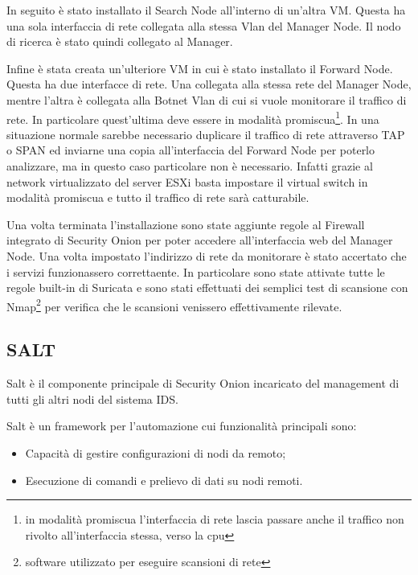 In seguito è stato installato il Search Node all'interno di un'altra VM. Questa ha una sola interfaccia di rete collegata alla stessa Vlan del Manager Node. Il nodo di ricerca è stato quindi collegato al Manager.

Infine è stata creata un'ulteriore VM in cui è stato installato il Forward Node. Questa ha due interfacce di rete. Una collegata alla stessa rete del Manager Node, mentre l'altra è collegata alla Botnet Vlan di cui si vuole monitorare il traffico di rete. In particolare quest'ultima deve essere in modalità promiscua\footnote{in modalità promiscua l'interfaccia di rete lascia passare anche il traffico non rivolto all'interfaccia stessa, verso la cpu}.
In una situazione normale sarebbe necessario duplicare il traffico di rete attraverso TAP o SPAN ed inviarne una copia all'interfaccia del Forward Node per poterlo analizzare, ma in questo caso particolare non è necessario. Infatti grazie al network virtualizzato del server ESXi basta impostare il virtual switch in modalità promiscua e tutto il traffico di rete sarà catturabile.

Una volta terminata l'installazione sono state aggiunte regole al Firewall integrato di Security Onion per poter accedere all'interfaccia web del Manager Node. 
Una volta impostato l'indirizzo di rete da monitorare è stato accertato che i servizi funzionassero correttaente.
In particolare sono state attivate tutte le regole built-in di Suricata e sono stati effettuati dei semplici test di scansione con Nmap\footnote{software utilizzato per eseguire scansioni di rete} \cite{nmap}  per verifica che le scansioni venissero effettivamente  rilevate.



\subsection{SALT}


Salt \cite{salt} è il componente principale di Security Onion incaricato del management di tutti gli altri nodi del sistema  IDS.

Salt è un framework per l'automazione cui funzionalità principali sono:
\begin{itemize}
    \item Capacità di gestire configurazioni di nodi da remoto;
    \item Esecuzione di comandi  e prelievo di dati su nodi remoti.
\end{itemize}

